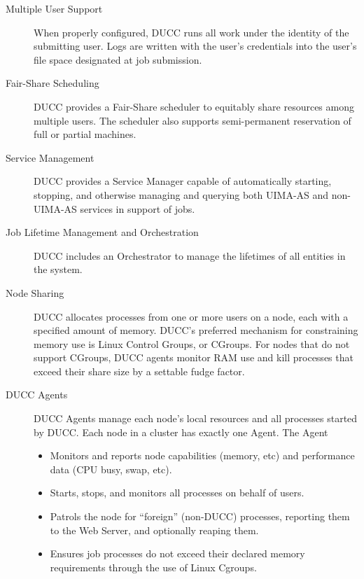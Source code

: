     \begin{description}
        \item[Multiple User Support] When properly configured, 
          DUCC runs all work under the identity of the submitting user. Logs
          are written with the user's credentials into the user's file space designated at job
          submission.

        \item[Fair-Share Scheduling] DUCC provides a Fair-Share scheduler to equitably share
          resources among multiple users.  The scheduler also supports semi-permanent reservation of
          full or partial machines.

        \item[Service Management] DUCC provides a Service Manager capable of automatically starting, stopping, and
          otherwise managing and querying both UIMA-AS and non-UIMA-AS services in support of jobs.

        \item[Job Lifetime Management and Orchestration] DUCC includes an Orchestrator to manage the
          lifetimes of all entities in the system.

        \item[Node Sharing] DUCC allocates processes from one or more users on a node, each with a specified
          amount of memory.  DUCC's preferred mechanism for constraining memory use is Linux
          Control Groups, or CGroups.  For nodes that do not support CGroups, DUCC agents monitor
          RAM use and kill processes that exceed their share size by a settable fudge factor.

        \item[DUCC Agents] DUCC Agents manage each node's local resources and all
          processes started by DUCC. Each node in a cluster has exactly one Agent. The Agent
          \begin{itemize}
            \item Monitors and reports node capabilities (memory, etc) and performance data (CPU busy,
              swap, etc).
            \item Starts, stops, and monitors all processes on behalf of users.
            \item Patrols the node for ``foreign'' (non-DUCC) processes, reporting them to the
              Web Server, and optionally reaping them.
            \item Ensures job processes do not exceed their declared memory requirements
              through the use of Linux Cgroups.
          \end{itemize}


\end{description}
